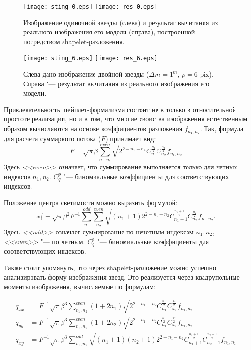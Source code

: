 \begin{figure}
\centering
\texttt{[image: stimg\_0.eps]}
\texttt{[image: res\_0.eps]}
\caption{Изображение одиночной звезды (слева) и результат вычитания из реального изображения его модели (справа), построенной посредством shapelet-разложения.}
\label{fig:model-stars}
\end{figure}

\begin{figure}
\centering
\texttt{[image: stimg\_6.eps]}
\texttt{[image: res\_6.eps]}
\caption{Слева дано изображение двойной звезды ($\Delta m=1^m$, $\rho=6$ pix). Справа "--- результат вычитания из реального изображения его модели.}
\label{fig:model-bin-stars}
\end{figure}

Привлекательность шейплет-формализма состоит не в только в относительной простоте реализации, но и в том, что многие свойства изображения естественным образом вычисляются на основе коэффициентов разложения $f_{n_1,n_2}$. Так, формула для расчета суммарного потока ($F$) принимает вид:
\begin{equation}
\label{eq:SHFlux}
 F = \sqrt{\pi} \beta \sum^{even}_{n_1,n_2} \sqrt{2^{2-n_1-n_2}C^{\frac{n_1}{2}}_{n_1}C^{\frac{n_2}{2}}_{n_2}}f_{n_1,n_2}
\end{equation}
Здесь \textit{<<even>>} означает, что суммирование выполняется только для четных индексов $n_1,n_2$. $C^{p}_{q}$ "--- биномиальные коэффициенты для соответствующих индексов.

Положение центра светимости можно выразить формулой:
\begin{equation}
\label{eq:SHPhCent}
x_1^f = \sqrt{\pi} \beta^2 F^{-1} \sum^{odd}_{n_1}\sum^{even}_{n_2} \sqrt{
(n_1+1)2^{2-n_1-n_2}C^{\frac{n_1+1}{2}}_{n_1+1}C^{\frac{n_2}{2}}_{n_2}}f_{n_1,n_2}.
\end{equation}
Здесь \textit{<<odd>>} означает суммирование по нечетным индексам $n_1,n_2$, \textit{<<even>>} "--- по четным. $C^{p}_{q}$ "--- биномиальные коэффициенты для соответствующих индексов.

Также стоит упомянуть, что через shapelet-разложение можно успешно анализировать форму изображения звезд. Это реализуется через квадрупольные моменты изображения,  вычисляемые по формулам:

\begin{align}\label{moments}
 q_{xx} & = F^{-1} \sqrt{\pi} \beta^3 \sum^{even}_{n_1,n_2} (1+2n_1) \sqrt{2^{2-n_1-n_2}C^{\frac{n_1}{2}}_{n_1}C^{\frac{n_2}{2}}_{n_2}}f_{n_1,n_2} \\
 q_{yy} & = F^{-1} \sqrt{\pi} \beta^3 \sum^{even}_{n_1,n_2} (1+2n_2) \sqrt{2^{2-n_1-n_2}C^{\frac{n_1}{2}}_{n_1}C^{\frac{n_2}{2}}_{n_2}}f_{n_1,n_2} \\
 q_{xy} & = F^{-1} \sqrt{\pi} \beta^3 \sum^{odd}_{n_1,n_2} \sqrt{(n_1+1)(n_2+1)2^{2-n_1-n_2}C^{\frac{n_1+1}{2}}_{n_1+1}C^{\frac{n_2+1}{2}}_{n_2+1}}f_{n_1,n_2}
\end{align}

